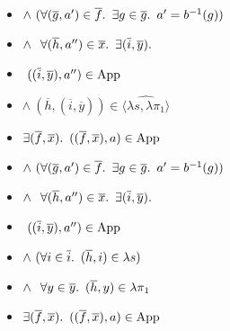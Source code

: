 \begin{itemize}
  \addtolength{\itemsep}{-.5\baselineskip}
  \item[\phantom{\imps}]
    \quad $\land~(\forall (\overline{g},a^\prime)\in\overline{f}\ldotp~\exists g\in\overline{g}\ldotp~a^\prime = b^{-1}(g))$

  \item[\phantom{\imps}]
    \quad $\land~\phantom{(}\forall(\overline{h},a^{\prime\prime})\in\overline{x}\ldotp~\exists(\overline{i},\overline{y})\ldotp$
    \marginnote{\Def-\ref{def:crel-comp}}

  \item[\phantom{\imps}]
    \quad\quad\quad\phantom{$\land$}$~((\overline{i},\overline{y}),a^{\prime\prime})\in\operatorname{App}$

  \item[\phantom{\imps}]
    \quad\quad\quad$\land~(\overline{h},(\overline{i},\overline{y}))\in\widehat{\langle\lambda s,\lambda\pi_1\rangle}$
  \addtolength{\itemsep}{.5\baselineskip}

  \item[\iffs]
    $\exists (\overline{f},\overline{x})\ldotp~((\overline{f},\overline{x}),a)\in\operatorname{App}$

  \addtolength{\itemsep}{-.5\baselineskip}
  \item[\phantom{\imps}]
    \quad $\land~(\forall (\overline{g},a^\prime)\in\overline{f}\ldotp~\exists g\in\overline{g}\ldotp~a^\prime = b^{-1}(g))$

  \item[\phantom{\imps}]
    \quad $\land~\phantom{(}\forall(\overline{h},a^{\prime\prime})\in\overline{x}\ldotp~\exists(\overline{i},\overline{y})\ldotp$

  \item[\phantom{\imps}]
    \quad\quad\quad\phantom{$\land$}$~((\overline{i},\overline{y}),a^{\prime\prime})\in\operatorname{App}$

  \item[\phantom{\imps}]
    \quad\quad\quad$\land~(\forall i\in\overline{i}\ldotp~(\overline{h},i)\in\lambda s)$

  \item[\phantom{\imps}]
    \quad\quad\quad$\land~\phantom{(}\forall y\in\overline{y}\ldotp~(\overline{h},y)\in\lambda\pi_1$
  \addtolength{\itemsep}{.5\baselineskip}

  \item[\iffs]
    $\exists (\overline{f},\overline{x})\ldotp~((\overline{f},\overline{x}),a)\in\operatorname{App}$


\end{itemize}
